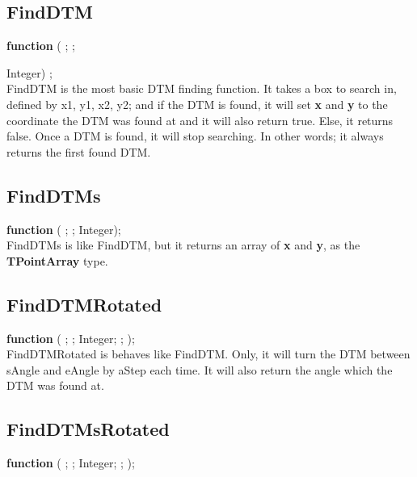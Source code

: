 \documentclass[a4paper]{report}
\begin{document}
\subsection{FindDTM}

\textbf{function} {\color{blue}{FindDTM}}({\color{typeRed}{DTM: }}
{\color{typeGreen}{Integer}}; {\color{typeRed}{out x, y: }}
{\color{typeGreen}{Integer}}; {\color{typeRed}{x1, y1, x2, y2: }}{\color{typeGreen}
{Integer}) {\color{typeGreen}{: Boolean}}; \\ 

FindDTM is the most basic DTM finding function. It takes a box to search in,
defined by x1, y1, x2, y2; and if the DTM is found, it will set \textbf{x} and 
\textbf{y} to the coordinate the DTM was found at and it will also return true. 
Else, it returns false. Once a DTM is found, it will stop searching. In other words; it always returns
the first found DTM.

\subsection{FindDTMs}

\textbf{function} {\color{blue}{FindDTMs}}({\color{typeRed}{DTM: }}
{\color{typeGreen}{Integer}}; {\color{typeRed}{out Points: }}
{\color{typeGreen}{TPointArray}}; {\color{typeRed}{x1, y1, x2, y2: }}{\color{typeGreen}
{Integer}}){\color{typeGreen}{: Boolean}}; \\

FindDTMs is like FindDTM, but it returns an array of \textbf{x} and \textbf{y}, as the
\textbf{TPointArray} type.

\subsection{FindDTMRotated}
\textbf{function} {\color{blue}{FindDTMRotated}}({\color{typeRed}{DTM: }}
{\color{typeGreen}{Integer}}; {\color{typeRed}{out x, y: }}
{\color{typeGreen}{Integer}}; {\color{typeRed}{x1, y1, x2, y2: }}{\color{typeGreen}
{Integer}}; {\color{typeRed}{sAngle, eAngle, aStep: }}{\color{typeGreen}{Extended}}; 
{\color{typeRed}{out aFound: }}{\color{typeGreen}{Extended}}){\color{typeGreen}{: Boolean}}; \\

FindDTMRotated is behaves like FindDTM. Only, it will turn the DTM between 
sAngle and eAngle by aStep each time. It will also return the angle which the DTM was found
at.

\subsection{FindDTMsRotated}
\textbf{function} {\color{blue}{FindDTMsRotated}}({\color{typeRed}{DTM: }}
{\color{typeGreen}{Integer}}; {\color{typeRed}{out Points: }}
{\color{typeGreen}{TPointArray}}; {\color{typeRed}{x1, y1, x2, y2: }}{\color{typeGreen}
{Integer}}; {\color{typeRed}{sAngle, eAngle, aStep: }}{\color{typeGreen}{Extended}}; 
{\color{typeRed}{out aFound: }}{\color{typeGreen}{T2DExtendedArray}}){\color{typeGreen}{: Boolean}}; \\

}
\end{document}
